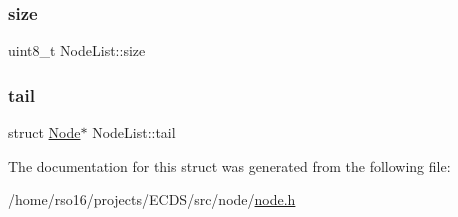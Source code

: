 \mbox{\label{structNodeList_a95b9e4691065c03c3e6bf81d40c7d57f}} 
\subsubsection{\texorpdfstring{size}{size}}
{\footnotesize\ttfamily uint8\+\_\+t Node\+List\+::size}

\mbox{\label{structNodeList_a5e1aefe538276375a3060f1a0a790ae7}} 
\subsubsection{\texorpdfstring{tail}{tail}}
{\footnotesize\ttfamily struct \hyperlink{structNode}{Node}$\ast$ Node\+List\+::tail}



The documentation for this struct was generated from the following file\+:\begin{DoxyCompactItemize}
\item 
/home/rso16/projects/\+E\+C\+D\+S/src/node/\hyperlink{node_8h}{node.\+h}\end{DoxyCompactItemize}
